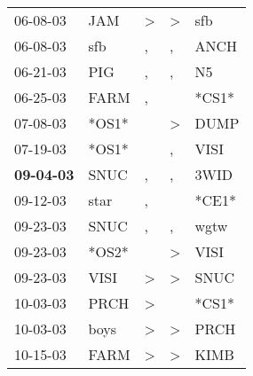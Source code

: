\begin{supertabular}{p{0.07\textwidth}p{0.06\textwidth}p{0.02\textwidth}p{0.02\textwidth}p{0.06\textwidth}}
          06-08-03\textsuperscript{} &            JAM\textsuperscript{} &     \textgreater &     \textgreater &            sfb\textsuperscript{} \\
          06-08-03\textsuperscript{} &            sfb\textsuperscript{} &                , &                , &           ANCH\textsuperscript{} \\
          06-21-03\textsuperscript{} &            PIG\textsuperscript{} &                , &                , &             N5\textsuperscript{} \\
          06-25-03\textsuperscript{} &           FARM\textsuperscript{} &                , &                  &                            *CS1* \\
          07-08-03\textsuperscript{} &                            *OS1* &                  &     \textgreater &           DUMP\textsuperscript{} \\
          07-19-03\textsuperscript{} &                            *OS1* &                  &                , &           VISI\textsuperscript{} \\
 \textbf{09-04-03\textsuperscript{}} &           SNUC\textsuperscript{} &                , &                , &           3WID\textsuperscript{} \\
          09-12-03\textsuperscript{} &           star\textsuperscript{} &                , &                  &                            *CE1* \\
          09-23-03\textsuperscript{} &           SNUC\textsuperscript{} &                , &                , &           wgtw\textsuperscript{} \\
          09-23-03\textsuperscript{} &                            *OS2* &                  &     \textgreater &           VISI\textsuperscript{} \\
          09-23-03\textsuperscript{} &           VISI\textsuperscript{} &     \textgreater &     \textgreater &           SNUC\textsuperscript{} \\
          10-03-03\textsuperscript{} &           PRCH\textsuperscript{} &     \textgreater &                  &                            *CS1* \\
          10-03-03\textsuperscript{} &           boys\textsuperscript{} &     \textgreater &     \textgreater &           PRCH\textsuperscript{} \\
          10-15-03\textsuperscript{} &           FARM\textsuperscript{} &     \textgreater &     \textgreater &           KIMB\textsuperscript{} \\

\end{supertabular}
